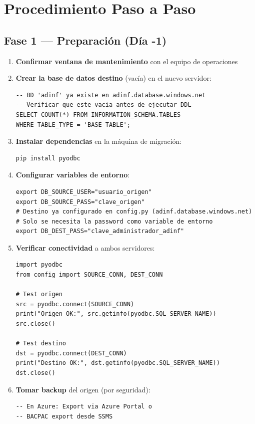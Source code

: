 \documentclass[12pt,a4paper,twoside]{report}
\begin{document}
\chapter{Procedimiento Paso a Paso}

\section{Fase 1 --- Preparaci\'on (D\'ia -1)}

\begin{enumerate}
    \item \textbf{Confirmar ventana de mantenimiento} con el equipo de operaciones
    \item \textbf{Crear la base de datos destino} (vac\'ia) en el nuevo servidor:
\begin{lstlisting}[style=sqlstyle]
-- BD 'adinf' ya existe en adinf.database.windows.net
-- Verificar que este vacia antes de ejecutar DDL
SELECT COUNT(*) FROM INFORMATION_SCHEMA.TABLES
WHERE TABLE_TYPE = 'BASE TABLE';
\end{lstlisting}
    \item \textbf{Instalar dependencias} en la m\'aquina de migraci\'on:
\begin{lstlisting}[style=bashstyle]
pip install pyodbc
\end{lstlisting}
    \item \textbf{Configurar variables de entorno}:
\begin{lstlisting}[style=bashstyle]
export DB_SOURCE_USER="usuario_origen"
export DB_SOURCE_PASS="clave_origen"
# Destino ya configurado en config.py (adinf.database.windows.net)
# Solo se necesita la password como variable de entorno
export DB_DEST_PASS="clave_administrador_adinf"
\end{lstlisting}
    \item \textbf{Verificar conectividad} a ambos servidores:
\begin{lstlisting}[style=pythonstyle]
import pyodbc
from config import SOURCE_CONN, DEST_CONN

# Test origen
src = pyodbc.connect(SOURCE_CONN)
print("Origen OK:", src.getinfo(pyodbc.SQL_SERVER_NAME))
src.close()

# Test destino
dst = pyodbc.connect(DEST_CONN)
print("Destino OK:", dst.getinfo(pyodbc.SQL_SERVER_NAME))
dst.close()
\end{lstlisting}
    \item \textbf{Tomar backup} del origen (por seguridad):
\begin{lstlisting}[style=sqlstyle]
-- En Azure: Export via Azure Portal o
-- BACPAC export desde SSMS
\end{lstlisting}
\end{enumerate}
\end{document}

